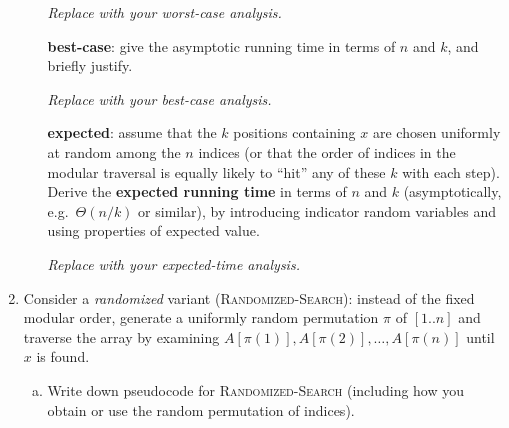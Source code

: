 \documentclass[dvipsnames]{article}
\begin{document}
\begin{problem}
\begin{enumerate}
\begin{enumerate}[(a)]
\color{purple}
\begin{mdframed}
  \color{purple}
  \emph{Replace with your worst-case analysis.}
\end{mdframed}

\color{black}\noindent
        \item[\textbf{best-case}:] give the asymptotic running time in terms of \(n\) and \(k\), and briefly justify.

\color{purple}
\begin{mdframed}
  \color{purple}
  \emph{Replace with your best-case analysis.}
\end{mdframed}

\color{black}\noindent
        \item[\textbf{expected}:] assume that the \(k\) positions containing \(x\) are chosen uniformly at random
        among the \(n\) indices (or that the order of indices in the modular traversal is equally likely to ``hit'' any of these \(k\) with each step).
        Derive the \textbf{expected running time} in terms of \(n\) and \(k\) (asymptotically, e.g.\ \(\Theta(n/k)\) or similar),
        by introducing indicator random variables and using properties of expected value.

\color{purple}
\begin{mdframed}
  \color{purple}
  \emph{Replace with your expected-time analysis.}
\end{mdframed}

      \end{enumerate}

\color{black}\noindent
    \item Consider a \emph{randomized} variant (\textsc{Randomized-Search}):
    instead of the fixed modular order, generate a uniformly random permutation \(\pi\) of \([1..n]\)
    and traverse the array by examining \(A[\pi(1)], A[\pi(2)], \dots, A[\pi(n)]\) until \(x\) is found.
      \begin{enumerate}[(a)]
        \item Write down pseudocode for \textsc{Randomized-Search} (including how you obtain or use the random permutation of indices).


\end{enumerate}
\end{enumerate}
\end{problem}
\end{document}
